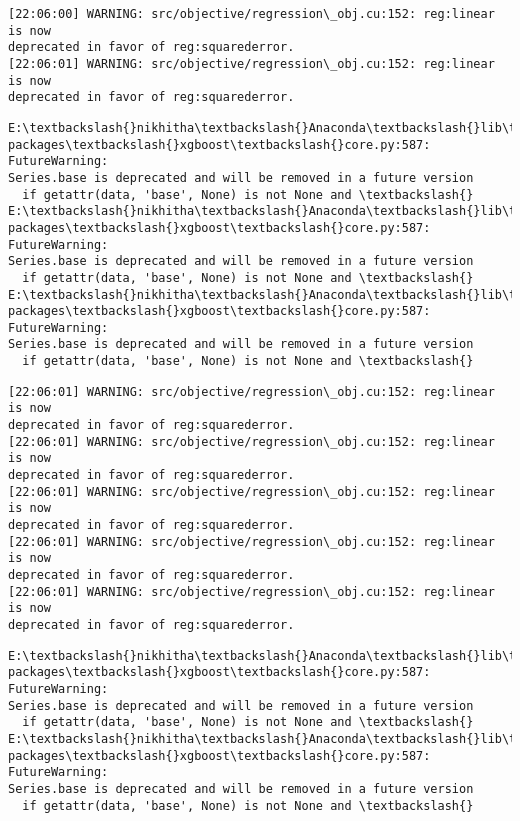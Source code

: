 \documentclass[11pt]{article}
\begin{document}
    \begin{Verbatim}[commandchars=\\\{\}]
[22:06:00] WARNING: src/objective/regression\_obj.cu:152: reg:linear is now
deprecated in favor of reg:squarederror.
[22:06:01] WARNING: src/objective/regression\_obj.cu:152: reg:linear is now
deprecated in favor of reg:squarederror.
    \end{Verbatim}

    \begin{Verbatim}[commandchars=\\\{\}]
E:\textbackslash{}nikhitha\textbackslash{}Anaconda\textbackslash{}lib\textbackslash{}site-packages\textbackslash{}xgboost\textbackslash{}core.py:587: FutureWarning:
Series.base is deprecated and will be removed in a future version
  if getattr(data, 'base', None) is not None and \textbackslash{}
E:\textbackslash{}nikhitha\textbackslash{}Anaconda\textbackslash{}lib\textbackslash{}site-packages\textbackslash{}xgboost\textbackslash{}core.py:587: FutureWarning:
Series.base is deprecated and will be removed in a future version
  if getattr(data, 'base', None) is not None and \textbackslash{}
E:\textbackslash{}nikhitha\textbackslash{}Anaconda\textbackslash{}lib\textbackslash{}site-packages\textbackslash{}xgboost\textbackslash{}core.py:587: FutureWarning:
Series.base is deprecated and will be removed in a future version
  if getattr(data, 'base', None) is not None and \textbackslash{}
    \end{Verbatim}

    \begin{Verbatim}[commandchars=\\\{\}]
[22:06:01] WARNING: src/objective/regression\_obj.cu:152: reg:linear is now
deprecated in favor of reg:squarederror.
[22:06:01] WARNING: src/objective/regression\_obj.cu:152: reg:linear is now
deprecated in favor of reg:squarederror.
[22:06:01] WARNING: src/objective/regression\_obj.cu:152: reg:linear is now
deprecated in favor of reg:squarederror.
[22:06:01] WARNING: src/objective/regression\_obj.cu:152: reg:linear is now
deprecated in favor of reg:squarederror.
[22:06:01] WARNING: src/objective/regression\_obj.cu:152: reg:linear is now
deprecated in favor of reg:squarederror.
    \end{Verbatim}

    \begin{Verbatim}[commandchars=\\\{\}]
E:\textbackslash{}nikhitha\textbackslash{}Anaconda\textbackslash{}lib\textbackslash{}site-packages\textbackslash{}xgboost\textbackslash{}core.py:587: FutureWarning:
Series.base is deprecated and will be removed in a future version
  if getattr(data, 'base', None) is not None and \textbackslash{}
E:\textbackslash{}nikhitha\textbackslash{}Anaconda\textbackslash{}lib\textbackslash{}site-packages\textbackslash{}xgboost\textbackslash{}core.py:587: FutureWarning:
Series.base is deprecated and will be removed in a future version
  if getattr(data, 'base', None) is not None and \textbackslash{}
    \end{Verbatim}
\end{document}
